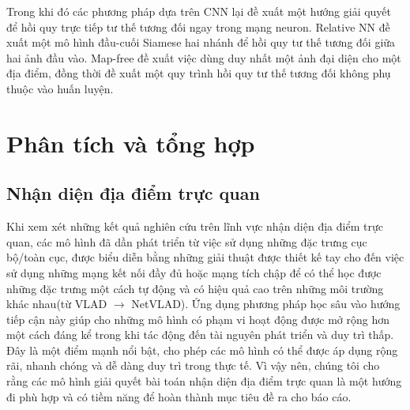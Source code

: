 Trong khi đó các phương pháp dựa trên CNN \cite{melekhov2017relative, saha2018improved, arnold2022mapfree} lại đề xuất một hướng giải quyết để hồi quy trực tiếp tư thế tương đối ngay trong mạng neuron. Relative NN \cite{melekhov2017relative} đề xuất một mô hình đầu-cuối Siamese hai nhánh để hồi quy tư thế tương đối giữa hai ảnh đầu vào. Map-free \cite{arnold2022mapfree} đề xuất việc dùng duy nhất một ảnh đại diện cho một địa điểm, đồng thời đề xuất một quy trình hồi quy tư thế tương đối không phụ thuộc vào huấn luyện.

\section{Phân tích và tổng hợp}

\subsection*{Nhận diện địa điểm trực quan}

Khi xem xét những kết quả nghiên cứu trên lĩnh vực nhận diện địa điểm trực quan, các mô hình đã dần phát triển từ việc sử dụng những đặc trưng cục bộ/toàn cục, được biểu diễn bằng những giải thuật được thiết kế tay cho đến việc sử dụng những mạng kết nối đầy đủ hoặc mạng tích chập để có thể học được những đặc trưng một cách tự động và có hiệu quả cao trên những môi trường khác nhau(từ VLAD $\rightarrow$ NetVLAD). Ứng dụng phương pháp học sâu vào hướng tiếp cận này giúp cho những mô hình có phạm vi hoạt động được mở rộng hơn một cách đáng kể trong khi tác động đến tài nguyên phát triển và duy trì thấp. Đây là một điểm mạnh nổi bật, cho phép các mô hình có thể được áp dụng rộng rãi, nhanh chóng và dễ dàng duy trì trong thực tế.
Vì vậy nên, chúng tôi cho rằng các mô hình giải quyết bài toán nhận diện địa điểm trực quan là một hướng đi phù hợp và có tiềm năng để hoàn thành mục tiêu đề ra cho báo cáo.


